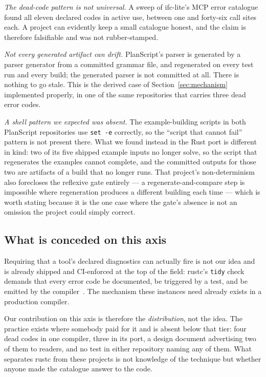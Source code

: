 \documentclass[10pt,journal,compsoc]{IEEEtran}
\begin{document}
\emph{The dead-code pattern is not universal.} A sweep of ifc-lite's MCP error catalogue found
all eleven declared codes in active use, between one and forty-six call sites each. A project
can evidently keep a small catalogue honest, and the claim is therefore falsifiable and was not
rubber-stamped.

\emph{Not every generated artifact can drift.} PlanScript's parser is generated by a parser
generator from a committed grammar file, and regenerated on every test run and every build; the
generated parser is not committed at all. There is nothing to go stale. This is the derived case
of Section~\ref{sec:mechanism} implemented properly, in one of the same repositories that
carries three dead error codes.

\emph{A shell pattern we expected was absent.} The example-building scripts in both PlanScript
repositories use \texttt{set -e} correctly, so the ``script that cannot fail'' pattern is not
present there. What we found instead in the Rust port is different in kind: two of its five
shipped example inputs no longer solve, so the script that regenerates the examples cannot
complete, and the committed outputs for those two are artifacts of a build that no longer runs.
That project's non-determinism also forecloses the reflexive gate entirely --- a
regenerate-and-compare step is impossible where regeneration produces a different building each
time --- which is worth stating because it is the one case where the gate's absence is not an
omission the project could simply correct.

\subsection{What is conceded on this axis}

Requiring that a tool's declared diagnostics can actually fire is not our idea and is already
shipped and CI-enforced at the top of the field: rustc's \texttt{tidy} check demands that every
error code be documented, be triggered by a test, and be emitted by the
compiler~\cite{rustc_tidy_errorcodes}. The mechanism these instances need already exists in a
production compiler.

Our contribution on this axis is therefore the \emph{distribution}, not the idea. The practice
exists where somebody paid for it and is absent below that tier: four dead codes in one
compiler, three in its port, a design document advertising two of them to readers, and no test
in either repository naming any of them. What separates rustc from these projects is not
knowledge of the technique but whether anyone made the catalogue answer to the code.
\end{document}
